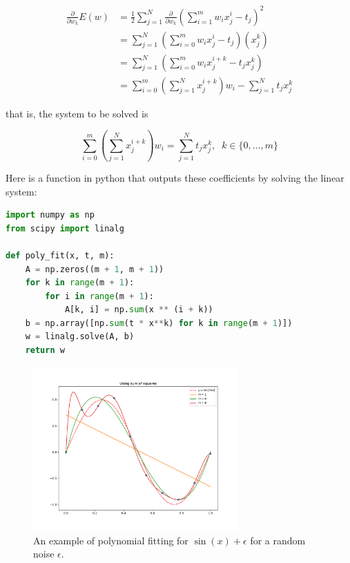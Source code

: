 \begin{align*}
	\frac{\partial}{\partial w_k} E(w) &= \frac{1}{2}\sum_{j=1}^N\frac{\partial}{\partial w_k}\left(\sum_{i=1}^mw_ix_j^i - t_j\right)^2\\
	&= \sum_{j=1}^N \left(\sum_{i=0}^mw_ix_j^i - t_j\right)(x_j^k)\\
	&= \sum_{j=1}^N \left(\sum_{i=0}^mw_ix_j^{i+k} - t_jx_j^k\right)\\
	&= \sum_{i=0}^m\left(\sum_{j=1}^N x_j^{i+k}\right) w_i - \sum_{j=1}^Nt_jx_j^k
\end{align*}

that is, the system to be solved is

\[\sum_{i=0}^m\left(\sum_{j=1}^N x_j^{i+k}\right) w_i = \sum_{j=1}^Nt_jx_j^k,\;\; k\in\{0,\dots,m\}\]

Here is a function in python that outputs these coefficients by solving the linear system:

\begin{mdframed}[backgroundcolor=black!10]
\begin{lstlisting}[language=python]
import numpy as np
from scipy import linalg

def poly_fit(x, t, m):
    A = np.zeros((m + 1, m + 1))
    for k in range(m + 1):
        for i in range(m + 1):
            A[k, i] = np.sum(x ** (i + k))
    b = np.array([np.sum(t * x**k) for k in range(m + 1)])
    w = linalg.solve(A, b)
    return w
\end{lstlisting}	
\end{mdframed}

\begin{figure}
	\centering
	\includegraphics[width=0.7\textwidth]{images/overfitting.pdf}
	\caption{An example of polynomial fitting for $\sin(x) + \epsilon$ for a random noise $\epsilon$.}
	\label{fig:1.overfitting}
\end{figure}

